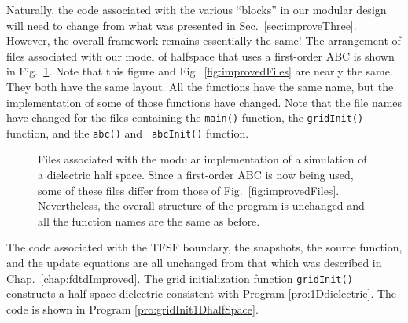 Naturally, the code associated with the various
``blocks'' in our modular design will need to change from what was
presented in Sec.\ \ref{sec:improveThree}.  However, the overall
framework remains essentially the same!  The arrangement of files
associated with our model of halfspace that uses a first-order ABC
is shown in Fig.\ \ref{fig:firstOrderAbcFiles}.  Note that this figure
and Fig.\ \ref{fig:improvedFiles} are nearly the same.  They both have
the same layout.  All the functions have the same name, but the
implementation of some of those functions have changed.  Note that the
file names have changed for the files containing the {\tt main()}
function, the {\tt gridInit()} function, and the {\tt abc()} and {\tt
  abcInit()} function.  
\begin{figure}
  \begin{center}
\end{center} \caption{Files associated with the modular implementation
  of a simulation of a dielectric half space.  Since a first-order ABC
  is now being used, some of these files differ from those of Fig.\
  \ref{fig:improvedFiles}.  Nevertheless, the overall structure of the
  program is unchanged and all the function names are the same as
  before.}
  \label{fig:firstOrderAbcFiles}
\end{figure}


The code associated with the TFSF boundary, the snapshots, the source
function, and the update equations are all unchanged from that which
was described in Chap.\ \ref{chap:fdtdImproved}.  The grid
initialization function {\tt gridInit()} constructs a half-space
dielectric consistent with Program \ref{pro:1Ddielectric}.  The code
is shown in Program \ref{pro:gridInit1DhalfSpace}.

